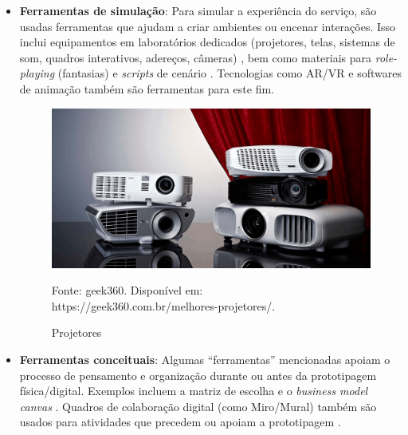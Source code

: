 \begin{itemize}
	\item \textbf{Ferramentas de simulação}: Para simular a experiência do serviço, são usadas ferramentas que ajudam a criar ambientes ou encenar interações. Isso inclui equipamentos em laboratórios dedicados (projetores, telas, sistemas de som, quadros interativos, adereços, câmeras) \cite{soto2023prototyping, yan2022pssvalue}, bem como materiais para \textit{role-playing} (fantasias) \cite{seko2024transitions} e \textit{scripts} de cenário \cite{seko2024transitions}. Tecnologias como AR/VR \cite{wang2023smartproducts, lee2022how, paust2025integrative} e softwares de animação \cite{lee2023industry, mager2023product} também são ferramentas para este fim.
	
	\begin{figure}[H]
		\centering
		\includegraphics[width=0.8\linewidth]{figuras/prototipo-projetor}
		\caption{Projetores}
		Fonte: geek360. Disponível em: https://geek360.com.br/melhores-projetores/. 
		\label{fig:ferramentas-prototipacao}
	\end{figure}
	
	\item \textbf{Ferramentas conceituais}: Algumas ``ferramentas'' mencionadas apoiam o processo de pensamento e organização durante ou antes da prototipagem física/digital. Exemplos incluem a matriz de escolha \cite{soto2023prototyping} e o \textit{business model canvas} \cite{you2022applying, paust2025integrative}. Quadros de colaboração digital (como Miro/Mural) também são usados para atividades que precedem ou apoiam a prototipagem \cite{quintero2021interdisciplinary, iriarte2023service}.
	

\end{itemize}
